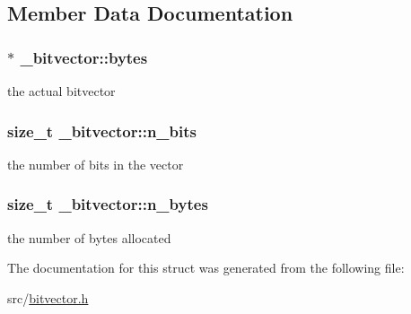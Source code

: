 \subsection{Member Data Documentation}
\hypertarget{struct__bitvector_a39ce08a096ed5e9e78605767e980c575}{
\subsubsection[{bytes}]{$\ast$ \+\_\+bitvector\+::bytes}}\label{struct__bitvector_a39ce08a096ed5e9e78605767e980c575}
the actual bitvector \hypertarget{struct__bitvector_a88d4b6ede6ccc52c995f7a84b7f9723e}{
\subsubsection[{n\+\_\+bits}]{\setlength{\rightskip}{0pt plus 5cm}size\+\_\+t \+\_\+bitvector\+::n\+\_\+bits}}\label{struct__bitvector_a88d4b6ede6ccc52c995f7a84b7f9723e}
the number of bits in the vector \hypertarget{struct__bitvector_a78dc0f5c85c269b46d9e4c7d7a39fa87}{
\subsubsection[{n\+\_\+bytes}]{\setlength{\rightskip}{0pt plus 5cm}size\+\_\+t \+\_\+bitvector\+::n\+\_\+bytes}}\label{struct__bitvector_a78dc0f5c85c269b46d9e4c7d7a39fa87}
the number of bytes allocated 

The documentation for this struct was generated from the following file\+:\begin{DoxyCompactItemize}
\item 
src/\hyperlink{bitvector_8h}{bitvector.\+h}\end{DoxyCompactItemize}
